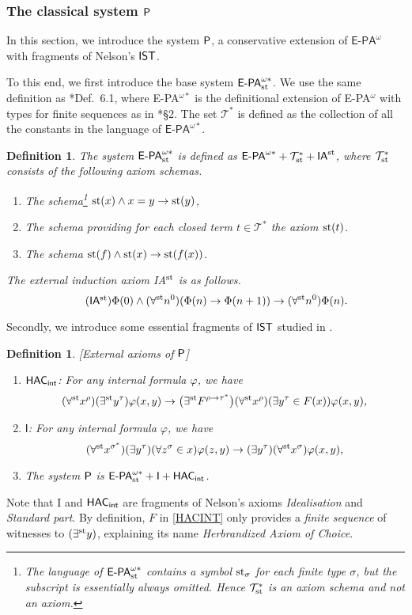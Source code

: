 \documentclass[reqno]{amsart}
\newtheorem{defi}[thm]{Definition}
\newcommand\be{\begin{equation}}
\newcommand\ee{\end{equation}}
\def\bdefi{\begin{defi}\rm}
\def\edefi{\end{defi}}
\def\IST{\textup{\textsf{IST}}}
\def\T{\mathcal{T}}
\def\P{\textup{\textsf{P}}}
\def\st{\textup{st}}
\def\di{\rightarrow}
\def\HAC{\textup{\textsf{HAC}}}
\def\INT{\textup{\textsf{int}}}
\numberwithin{equation}{section}
\numberwithin{thm}{section}
\begin{document}
\subsubsection{The classical system $\P$}\label{PIPI}
In this section, we introduce the system $\P$, a conservative extension of $\textsf{E-PA}^{\omega}$ with fragments of Nelson's $\IST$.  

\medskip

To this end, we first introduce the base system $\textsf{E-PA}_{\st}^{\omega*}$.  
We use the same definition as \cite{brie}*{Def.~6.1}, where \textsf{E-PA}$^{\omega*}$ is the definitional extension of \textsf{E-PA}$^{\omega}$ with types for finite sequences as in \cite{brie}*{\S2}.  
The set $\T^{*}$ is defined as the collection of all the constants in the language of $\textsf{E-PA}^{\omega*}$.    
\bdefi\label{debs}
The system $ \textsf{E-PA}^{\omega*}_{\st} $ is defined as $ \textsf{E-PA}^{\omega{*}} + \T^{*}_{\st} + \textsf{IA}^{\st}$, where $\T^{*}_{\st}$
consists of the following axiom schemas.
\begin{enumerate}
\item The schema\footnote{The language of $\textsf{E-PA}_{\st}^{\omega*}$ contains a symbol $\st_{\sigma}$ for each finite type $\sigma$, but the subscript is essentially always omitted.  Hence $\T^{*}_{\st}$ is an \emph{axiom schema} and not an axiom.\label{omit}} $\st(x)\wedge x=y\di\st(y)$,
\item The schema providing for each closed term $t\in \T^{*}$ the axiom $\st(t)$.
\item The schema $\st(f)\wedge \st(x)\di \st(f(x))$.
\end{enumerate}
The external induction axiom \textsf{IA}$^{\st}$ is as follows.  
\be\tag{\textsf{IA}$^{\st}$}
\Phi(0)\wedge(\forall^{\st}n^{0})(\Phi(n) \di\Phi(n+1))\di(\forall^{\st}n^{0})\Phi(n).     
\ee
\edefi
Secondly, we introduce some essential fragments of $\IST$ studied in \cite{brie}.  
\bdefi[External axioms of $\P$]~
\begin{enumerate}
\item$\HAC_{\INT}$: For any internal formula $\varphi$, we have
\be\label{HACINT}
(\forall^{\st}x^{\rho})(\exists^{\st}y^{\tau})\varphi(x, y)\di \big(\exists^{\st}F^{\rho\di \tau^{*}}\big)(\forall^{\st}x^{\rho})(\exists y^{\tau}\in F(x))\varphi(x,y),
\ee
\item $\textsf{I}$: For any internal formula $\varphi$, we have
\[
(\forall^{\st} x^{\sigma^{*}})(\exists y^{\tau} )(\forall z^{\sigma}\in x)\varphi(z,y)\di (\exists y^{\tau})(\forall^{\st} x^{\sigma})\varphi(x,y), 
\]
\item The system $\P$ is $\textsf{E-PA}_{\st}^{\omega*}+\textsf{I}+\HAC_{\INT}$.
\end{enumerate}
\end{defi}
Note that \textsf{I} and $\HAC_{\INT}$ are fragments of Nelson's axioms \emph{Idealisation} and \emph{Standard part}.  
By definition, $F$ in \eqref{HACINT} only provides a \emph{finite sequence} of witnesses to $(\exists^{\st}y)$, explaining its name \emph{Herbrandized Axiom of Choice}.   
\end{document}
